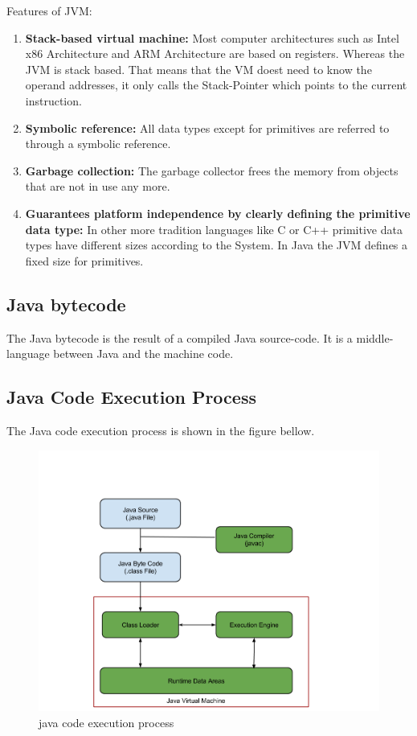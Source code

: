 \newpage
Features of JVM:
\begin{enumerate}
\item \textbf{Stack-based virtual machine:} Most computer architectures such as Intel x86 Architecture and ARM Architecture are based on registers. Whereas the JVM is stack based.\cite{javaJVM} That means that the VM doest need to know the operand addresses, it only calls the Stack-Pointer which points to the current instruction. \cite{stackBased_vs_registerBased} 
\item \textbf{Symbolic reference:} All data types except for primitives are referred to through a symbolic reference.   
\item \textbf{Garbage collection:} The garbage collector frees the memory from objects that are not in use any more. \cite{javaGarbageCollector}  
\item \textbf{Guarantees platform independence by clearly defining the primitive data type:} In other more tradition languages like C or C++ primitive data types have different sizes according to the System. In Java the JVM defines a fixed size for primitives. 
\end{enumerate} \cite{javaJVM}
\newpage
\subsection{Java bytecode}
The Java bytecode is the result of a compiled Java source-code. It is a middle-language between Java and the machine code. \cite{javaJVM}  

\subsection{Java Code Execution Process} 
The Java code execution process is shown in the figure bellow. 
\begin{figure}[H]
\centering
\includegraphics[width=1.0\linewidth]{graphics/java-code-execution-process.png}
\caption{java code execution process}
\end{figure}
